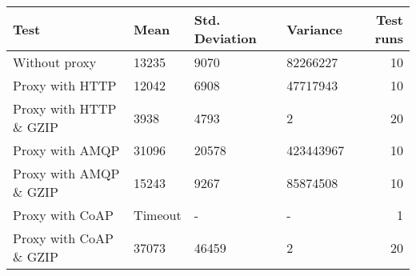 \begin{tabular}{llllr}
\hline
 Test                   & Mean    & Std. Deviation   & Variance   &   Test runs \\
\hline
 Without proxy          & 13235   & 9070             & 82266227   &          10 \\
 Proxy with HTTP        & 12042   & 6908             & 47717943   &          10 \\
 Proxy with HTTP \& GZIP & 3938    & 4793             & 2          &          20 \\
 Proxy with AMQP        & 31096   & 20578            & 423443967  &          10 \\
 Proxy with AMQP \& GZIP & 15243   & 9267             & 85874508   &          10 \\
 Proxy with CoAP        & Timeout & -                & -          &           1 \\
 Proxy with CoAP \& GZIP & 37073   & 46459            & 2          &          20 \\
\hline
\end{tabular}